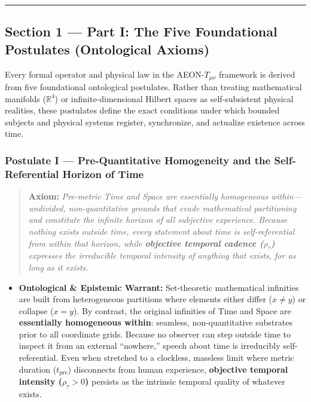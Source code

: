 \documentclass[
]{article}
\providecommand{\tightlist}{%
  \setlength{\itemsep}{0pt}\setlength{\parskip}{0pt}}
\begin{document}
\begin{center}\rule{0.5\linewidth}{0.5pt}\end{center}

\subsection{Section 1 --- Part I: The Five Foundational Postulates
(Ontological
Axioms)}\label{section-1-part-i-the-five-foundational-postulates-ontological-axioms}

Every formal operator and physical law in the AEON-\(T_{\mu\nu}\)
framework is derived from five foundational ontological postulates.
Rather than treating mathematical manifolds (\(\mathbb{R}^4\)) or
infinite-dimensional Hilbert spaces as self-subsistent physical
realities, these postulates define the exact conditions under which
bounded subjects and physical systems register, synchronize, and
actualize existence across time.

\subsubsection{Postulate I --- Pre-Quantitative Homogeneity and the
Self-Referential Horizon of
Time}\label{postulate-i-pre-quantitative-homogeneity-and-the-self-referential-horizon-of-time}

\begin{quote}
\textbf{Axiom:} \emph{Pre-metric Time and Space are essentially
homogeneous within---undivided, non-quantitative grounds that evade
mathematical partitioning and constitute the infinite horizon of all
subjective experience. Because nothing exists outside time, every
statement about time is self-referential from within that horizon, while
\textbf{objective temporal cadence (\(\rho_\tau\))} expresses the
irreducible temporal intensity of anything that exists, for as long as
it exists.}
\end{quote}

\begin{itemize}
\tightlist
\item
  \textbf{Ontological \& Epistemic Warrant:} Set-theoretic mathematical
  infinities are built from heterogeneous partitions where elements
  either differ (\(x \neq y\)) or collapse (\(x = y\)). By contrast, the
  original infinities of Time and Space are \textbf{essentially
  homogeneous within}: seamless, non-quantitative substrates prior to
  all coordinate grids. Because no observer can step outside time to
  inspect it from an external ``nowhere,'' speech about time is
  irreducibly self-referential. Even when stretched to a clockless,
  massless limit where metric duration (\(t_{\mathrm{pre}}\))
  disconnects from human experience, \textbf{objective temporal
  intensity (\(\rho_\tau > 0\))} persists as the intrinsic temporal
  quality of whatever exists.
\end{itemize}
\end{document}

